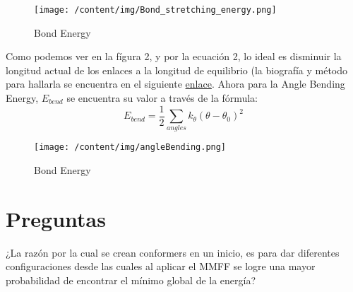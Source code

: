 \documentclass{article}%
\begin{document}
\begin{figure}[H]%
\centering%
\texttt{[image: /content/img/Bond\_stretching\_energy.png]}%
\caption{Bond Energy}%
\end{figure}

%
Como podemos ver en la fígura 2, y por la ecuación 2, lo ideal es disminuir la longitud actual de los enlaces a la longitud de equilibrio (la biografía y método para hallarla se encuentra en el siguiente \href{https://chem.libretexts.org/Bookshelves/Physical_and_Theoretical_Chemistry_Textbook_Maps/Supplemental_Modules_(Physical_and_Theoretical_Chemistry)/Chemical_Bonding/Fundamentals_of_Chemical_Bonding/Bond_Order_and_Lengths}{enlace}. Ahora para la Angle Bending Energy, $E_{bend}$ se encuentra su valor a través de la fórmula:%
\begin{equation}
    E_{bend} = \frac{1}{2} \sum_{angles} k_\theta (\theta - \theta_0)^2
\end{equation}%


\begin{figure}[H]%
\centering%
\texttt{[image: /content/img/angleBending.png]}%
\caption{Bond Energy}%
\end{figure}

%
\section{Preguntas}%
\label{sec:Preguntas}%
¿La razón por la cual se crean conformers en un inicio, es para dar diferentes configuraciones desde las cuales al aplicar el MMFF se logre una mayor probabilidad de encontrar el mínimo global de la energía?

%
\end{document}
